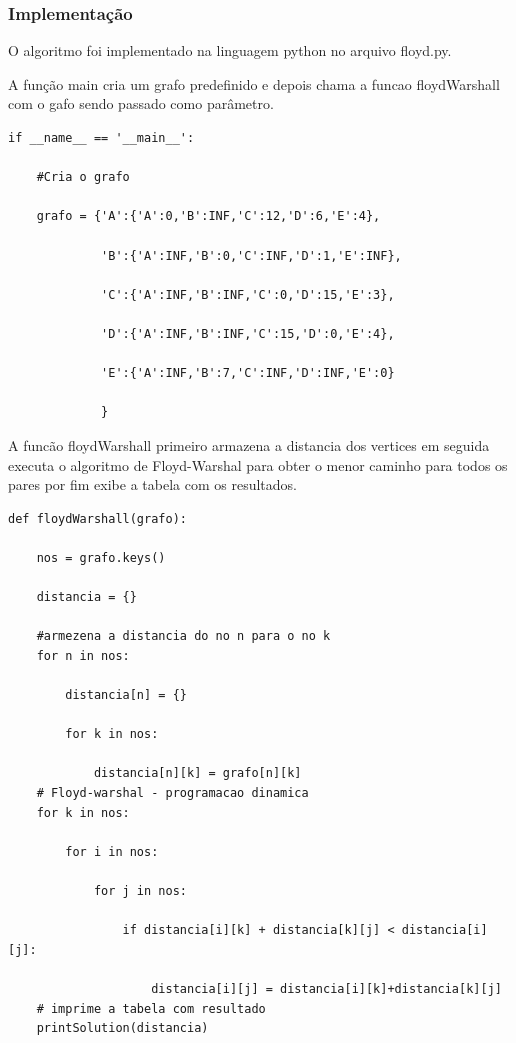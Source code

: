 \documentclass[a4paper,12pt]{article}
\begin{document}
\subsubsection{Implementação}
O algoritmo foi implementado na linguagem python no arquivo floyd.py.

A função main cria um grafo predefinido e depois chama a funcao floydWarshall com o gafo sendo passado como parâmetro.
\begin{lstlisting}
if __name__ == '__main__':
	
	#Cria o grafo

    grafo = {'A':{'A':0,'B':INF,'C':12,'D':6,'E':4},

             'B':{'A':INF,'B':0,'C':INF,'D':1,'E':INF},

             'C':{'A':INF,'B':INF,'C':0,'D':15,'E':3},

             'D':{'A':INF,'B':INF,'C':15,'D':0,'E':4},

             'E':{'A':INF,'B':7,'C':INF,'D':INF,'E':0}

             }
\end{lstlisting}
 
A funcão floydWarshall primeiro armazena a distancia dos vertices em seguida executa o algoritmo de Floyd-Warshal para obter o menor caminho para todos os pares por fim exibe a tabela com os resultados.
\begin{lstlisting}
def floydWarshall(grafo):

    nos = grafo.keys()

    distancia = {}
	
	#armezena a distancia do no n para o no k
    for n in nos:

        distancia[n] = {}

        for k in nos:

            distancia[n][k] = grafo[n][k]
	# Floyd-warshal - programacao dinamica
    for k in nos:

        for i in nos:

            for j in nos:

                if distancia[i][k] + distancia[k][j] < distancia[i][j]:

                    distancia[i][j] = distancia[i][k]+distancia[k][j]
	# imprime a tabela com resultado
    printSolution(distancia)
\end{lstlisting}
\end{document}

